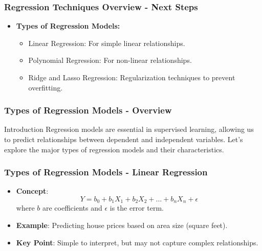 \documentclass[aspectratio=169]{beamer}
\begin{document}
\begin{frame}[fragile]
    \frametitle{Regression Techniques Overview - Next Steps}
    \begin{itemize}
        \item \textbf{Types of Regression Models:}
            \begin{itemize}
                \item Linear Regression: For simple linear relationships.
                \item Polynomial Regression: For non-linear relationships.
                \item Ridge and Lasso Regression: Regularization techniques to prevent overfitting.
            \end{itemize}
    \end{itemize}
\end{frame}

\begin{frame}[fragile]
    \frametitle{Types of Regression Models - Overview}
    \begin{block}{Introduction}
        Regression models are essential in supervised learning, allowing us to predict relationships between dependent and independent variables.
        Let's explore the major types of regression models and their characteristics.
    \end{block}
\end{frame}

\begin{frame}[fragile]
    \frametitle{Types of Regression Models - Linear Regression}
    \begin{itemize}
        \item \textbf{Concept}: 
        \begin{equation}
            Y = b_0 + b_1X_1 + b_2X_2 + ... + b_nX_n + \epsilon 
        \end{equation}
        where $b$ are coefficients and $\epsilon$ is the error term.
        
        \item \textbf{Example}: Predicting house prices based on area size (square feet).
        
        \item \textbf{Key Point}: Simple to interpret, but may not capture complex relationships.
    \end{itemize}
\end{frame}
\end{document}
